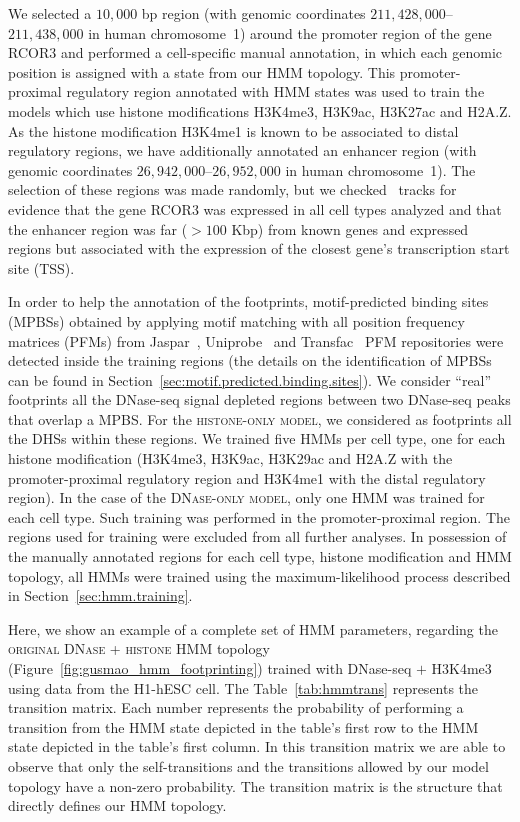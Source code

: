 We selected a $10,000$ bp region (with genomic coordinates $211,428,000$--$211,438,000$ in human chromosome~1) around the promoter region of the gene RCOR3 and performed a cell-specific manual annotation, in which each genomic position is assigned with a state from our HMM topology. This promoter-proximal regulatory region annotated with HMM states was used to train the models which use histone modifications H3K4me3, H3K9ac, H3K27ac and H2A.Z. As the histone modification H3K4me1 is known to be associated to distal regulatory regions, we have additionally annotated an enhancer region (with genomic coordinates $26,942,000$--$26,952,000$ in human chromosome~1). The selection of these regions was made randomly, but we checked~\cite{encode2012} tracks for evidence that the gene RCOR3 was expressed in all cell types analyzed and that the enhancer region was far ($>100$ Kbp) from known genes and expressed regions but associated with the expression of the closest gene's transcription start site (TSS).

In order to help the annotation of the footprints, motif-predicted binding sites (MPBSs) obtained by applying motif matching with all position frequency matrices (PFMs) from Jaspar~\citep{mathelier2014}, Uniprobe~\citep{robasky2011} and Transfac~\citep{matys2006} PFM repositories were detected inside the training regions (the details on the identification of MPBSs can be found in Section~\ref{sec:motif.predicted.binding.sites}). We consider ``real'' footprints all the DNase-seq signal depleted regions between two DNase-seq peaks that overlap a MPBS. For the \textsc{histone-only model}, we considered as footprints all the DHSs within these regions. We trained five HMMs per cell type, one for each histone modification (H3K4me3, H3K9ac, H3K29ac and H2A.Z with the promoter-proximal regulatory region and H3K4me1 with the distal regulatory region). In the case of the \textsc{DNase-only model}, only one HMM was trained for each cell type. Such training was performed in the promoter-proximal region. The regions used for training were excluded from all further analyses. In possession of the manually annotated regions for each cell type, histone modification and HMM topology, all HMMs were trained using the maximum-likelihood process described in Section~\ref{sec:hmm.training}.

Here, we show an example of a complete set of HMM parameters, regarding the \textsc{original DNase + histone} HMM topology (Figure~\ref{fig:gusmao_hmm_footprinting}) trained with DNase-seq $+$ H3K4me3 using data from the H1-hESC cell. The Table~\ref{tab:hmmtrans} represents the transition matrix. Each number represents the probability of performing a transition from the HMM state depicted in the table's first row to the HMM state depicted in the table's first column. In this transition matrix we are able to observe that only the self-transitions and the transitions allowed by our model topology have a non-zero probability. The transition matrix is the structure that directly defines our HMM topology.


